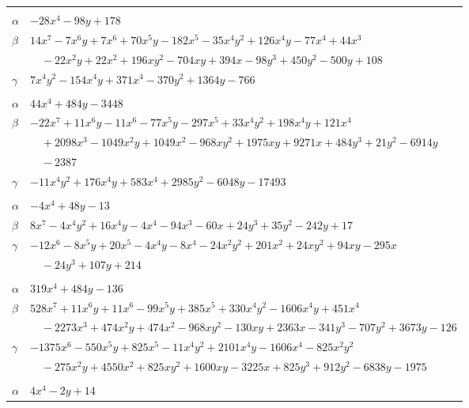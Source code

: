 \documentclass[11pt]{article}
\begin{document}
\begin{longtable}{@{}ll@{}}
\addlinespace[3pt]
\multicolumn{2}{@{}l}{$\{i,j\}=\{18,24\}$, $k_{ij}=2^{5}\cdot 3\cdot 5$}\\
$\alpha$ & $-28x^{4}-98y+178$\\
$\beta$ & $14x^{7}-7x^{6}y+7x^{6}+70x^{5}y-182x^{5}-35x^{4}y^{2}+126x^{4}y-77x^{4}+44x^{3}$\\
 & $\quad -22x^{2}y+22x^{2}+196xy^{2}-704xy+394x-98y^{3}+450y^{2}-500y+108$\\
$\gamma$ & $7x^{4}y^{2}-154x^{4}y+371x^{4}-370y^{2}+1364y-766$\\
\addlinespace[3pt]
\multicolumn{2}{@{}l}{$\{i,j\}=\{18,26\}$, $k_{ij}=2^{5}\cdot 3^{6}$}\\
$\alpha$ & $44x^{4}+484y-3448$\\
$\beta$ & $-22x^{7}+11x^{6}y-11x^{6}-77x^{5}y-297x^{5}+33x^{4}y^{2}+198x^{4}y+121x^{4}$\\
 & $\quad +2098x^{3}-1049x^{2}y+1049x^{2}-968xy^{2}+1975xy+9271x+484y^{3}+21y^{2}-6914y$\\
 & $\quad -2387$\\
$\gamma$ & $-11x^{4}y^{2}+176x^{4}y+583x^{4}+2985y^{2}-6048y-17493$\\
\addlinespace[3pt]
\multicolumn{2}{@{}l}{$\{i,j\}=\{18,27\}$, $k_{ij}=2\cdot 3\cdot 5\cdot 7$}\\
$\alpha$ & $-4x^{4}+48y-13$\\
$\beta$ & $8x^{7}-4x^{4}y^{2}+16x^{4}y-4x^{4}-94x^{3}-60x+24y^{3}+35y^{2}-242y+17$\\
$\gamma$ & $-12x^{6}-8x^{5}y+20x^{5}-4x^{4}y-8x^{4}-24x^{2}y^{2}+201x^{2}+24xy^{2}+94xy-295x$\\
 & $\quad -24y^{3}+107y+214$\\
\addlinespace[3pt]
\multicolumn{2}{@{}l}{$\{i,j\}=\{19,25\}$, $k_{ij}=2\cdot 5$}\\
$\alpha$ & $319x^{4}+484y-136$\\
$\beta$ & $528x^{7}+11x^{6}y+11x^{6}-99x^{5}y+385x^{5}+330x^{4}y^{2}-1606x^{4}y+451x^{4}$\\
 & $\quad -2273x^{3}+474x^{2}y+474x^{2}-968xy^{2}-130xy+2363x-341y^{3}-707y^{2}+3673y-126$\\
$\gamma$ & $-1375x^{6}-550x^{5}y+825x^{5}-11x^{4}y^{2}+2101x^{4}y-1606x^{4}-825x^{2}y^{2}$\\
 & $\quad -275x^{2}y+4550x^{2}+825xy^{2}+1600xy-3225x+825y^{3}+912y^{2}-6838y-1975$\\
\addlinespace[3pt]
\multicolumn{2}{@{}l}{$\{i,j\}=\{19,32\}$, $k_{ij}=2^{5}\cdot 3$}\\
$\alpha$ & $4x^{4}-2y+14$\\

\end{longtable}
\end{document}
